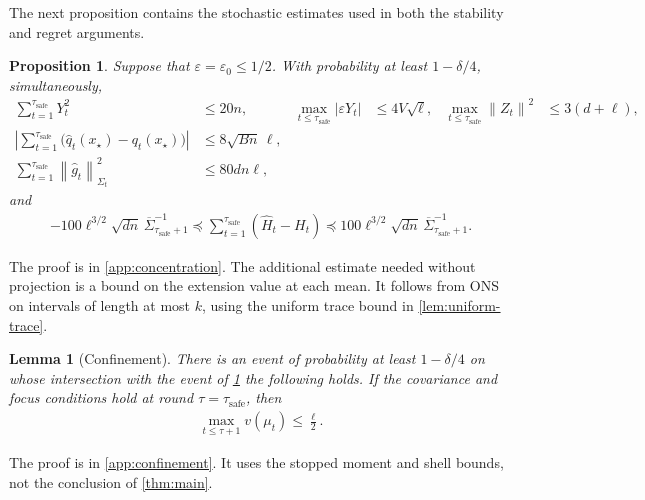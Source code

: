 \documentclass[11pt]{article}
\newtheorem{proposition}[proposition]{Proposition}
\newtheorem{lemma}[lemma]{Lemma}
\newcommand{\1}{\mathbf 1}
\newcommand{\eps}{\varepsilon}
\newcommand{\norm}[1]{\left\lVert #1\right\rVert}
\newcommand{\normm}[2]{\left\lVert #1\right\rVert_{#2}}
\begin{document}
The next proposition contains the stochastic estimates used in both the
stability and regret arguments.
\begin{proposition}
    \label{prop:concentration}
    Suppose that $\eps=\eps_0\leq1/2$. With probability at least
    $1-\delta/4$, simultaneously,
    \begin{align}
        \sum_{t=1}^{\tau_{\mathrm{safe}}}Y_t^2 & \leq20n,
                                               & \max_{t\leq\tau_{\mathrm{safe}}}|\eps Y_t|   & \leq4V\sqrt\ell,
                                               & \max_{t\leq\tau_{\mathrm{safe}}}\norm{Z_t}^2 & \leq3(d+\ell),
        \label{eq:stopped-increment-bounds}
        \\
        \left|
        \sum_{t=1}^{\tau_{\mathrm{safe}}}
        \bigl(\widehat q_t(x_\star)-q_t(x_\star)\bigr)
        \right|
                                               & \leq8\sqrt{Bn}\,\ell,
        \label{eq:q-concentration}
        \\
        \sum_{t=1}^{\tau_{\mathrm{safe}}}
        \normm{\widehat g_t}{\Sigma_t}^2
                                               & \leq80dn\ell,
        \label{eq:gradient-energy}
    \end{align}
    and
    \begin{align}
        -100\ell^{3/2}\sqrt{dn}\,
        \overline\Sigma_{\tau_{\mathrm{safe}}+1}^{-1}
        \preceq
        \sum_{t=1}^{\tau_{\mathrm{safe}}}(\widehat H_t-H_t)
        \preceq
        100\ell^{3/2}\sqrt{dn}\,
        \overline\Sigma_{\tau_{\mathrm{safe}}+1}^{-1}.
        \label{eq:H-concentration}
    \end{align}
\end{proposition}
The proof is in \cref{app:concentration}. The additional estimate needed
without projection is a bound on the extension value at each mean.
It follows from ONS on intervals of length at most $k$, using the
uniform trace bound in \cref{lem:uniform-trace}.
\begin{lemma}[Confinement]
    \label{lem:confinement}
    There is an event of probability at least $1-\delta/4$ on whose
    intersection with the event of \cref{prop:concentration} the following
    holds. If the covariance and focus conditions hold at round
    $\tau=\tau_{\mathrm{safe}}$, then
    \begin{align}
        \max_{t\leq\tau+1}v(\mu_t)\leq\frac\ell2.
        \label{eq:confinement}
    \end{align}
\end{lemma}
The proof is in \cref{app:confinement}. It uses the stopped moment and
shell bounds, not the conclusion of \cref{thm:main}.
\end{document}
